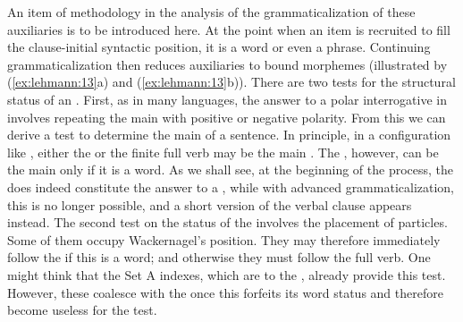 \documentclass[output=paper]{langsci/langscibook}
\begin{document}
An item of methodology in the analysis of the grammaticalization of these auxiliaries is to be introduced here. At the point when an item is recruited to fill the clause-initial syntactic position, it is a word or even a phrase. Continuing grammaticalization then reduces auxiliaries to bound morphemes (illustrated by (\ref{ex:lehmann:13}a) and (\ref{ex:lehmann:13}b)). There are two tests for the structural status of an . First, as in many languages, the answer to a polar interrogative in  involves repeating the main  with positive or negative polarity. From this we can derive a test to determine the main  of a sentence. In principle, in a configuration like , either the  or the finite full verb may be the main . The , however, can be the main  only if it is a word. As we shall see, at the beginning of the process, the  does indeed constitute the answer to a , while with advanced grammaticalization, this is no longer possible, and a short version of the verbal clause appears instead. The second test on the status of the  involves the placement of  particles. Some of them occupy Wackernagel’s position. They may therefore immediately follow the  if this is a word; and otherwise they must follow the full verb. One might think that the Set A indexes, which are  to the , already provide this test. However, these coalesce with the  once this forfeits its word status and therefore become useless for the test.
\end{document}
